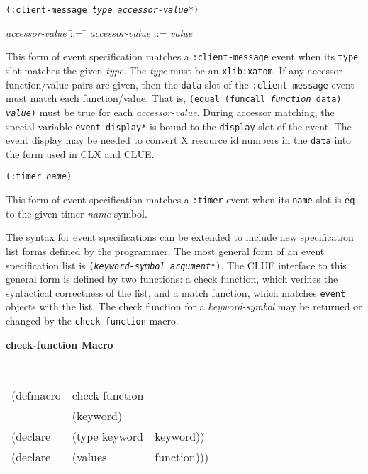 \documentclass[twoside]{book}
\begin{document}
\begin{sloppy}
{\samepage
{}
{\tt (:client-message {\em type} {\em accessor-value*})}\\
\hspace*{.75in}
\parbox[t]{5.75in}{
\begin{tabbing}
{\em accessor-value} \= ::= \= \kill
{\em accessor-value} \>::=  {\em value} \\
\end{tabbing}}
}
\begin{flushright}
\parbox[t]{5.75in}{
This
form of event specification matches a {\tt :client-message}
event when its {\tt type} slot matches the given {\em type}. The {\em
type} must be an {\tt xlib:xatom}. If
any accessor function/value pairs are
given, then the {\tt data} slot of the {\tt :client-message} event must
match each function/value. That is, {\tt (equal (funcall {\em function}
data) {\em value})} must be true for each {\em accessor-value}.
During accessor matching, the special variable {\tt *event-display*} is
bound to the {\tt display} slot of the event. The event display may be
needed to convert X resource id numbers in the {\tt data} into the form
used in CLX and CLUE.}
\end{flushright}
 
{\samepage
{}
{\tt (:timer {\em name})}\\
\begin{flushright}
\parbox[t]{5.75in}{
This
form of event specification matches a {\tt :timer}
event when its {\tt name} slot is {\tt eq} to the given timer {\em name}
symbol.} \end{flushright}
}
 

The syntax for event specifications can be extended to include new
specification list forms defined by the programmer. 
The most general
form of an event specification list is {\tt ({\em keyword-symbol
argument*})}. The CLUE interface to this general form is defined by two
functions: a check function, which verifies the syntactical
correctness of the list, and a match function, which matches {\tt event}
objects with the list. The check  function for a {\em keyword-symbol}
may be returned or changed by the {\tt check-function} macro. 

{\samepage
{\large {\bf check-function \hfill Macro}} 
\begin{flushright} \parbox[t]{6.125in}{
\tt
\begin{tabular}{lll}
\raggedright
(defmacro & check-function & \\ 
& (keyword) \\
(declare &(type keyword & keyword))\\
(declare &(values  & function)))
\end{tabular}
\rm

}
\end{flushright}}
\end{sloppy}
\end{document}
